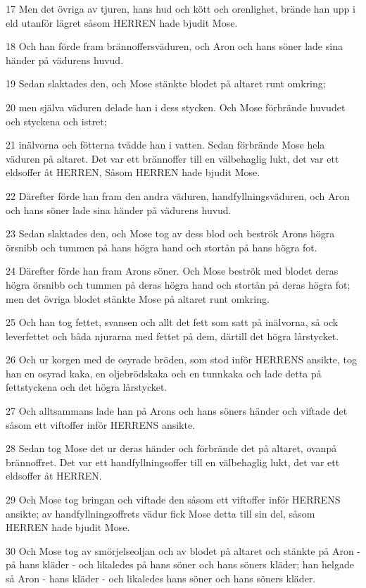 \par 17 Men det övriga av tjuren, hans hud och kött och orenlighet, brände han upp i eld utanför lägret såsom HERREN hade bjudit Mose.
\par 18 Och han förde fram brännoffersväduren, och Aron och hans söner lade sina händer på vädurens huvud.
\par 19 Sedan slaktades den, och Mose stänkte blodet på altaret runt omkring;
\par 20 men själva väduren delade han i dess stycken. Och Mose förbrände huvudet och styckena och istret;
\par 21 inälvorna och fötterna tvådde han i vatten. Sedan förbrände Mose hela väduren på altaret. Det var ett brännoffer till en välbehaglig lukt, det var ett eldsoffer åt HERREN, Såsom HERREN hade bjudit Mose.
\par 22 Därefter förde han fram den andra väduren, handfyllningsväduren, och Aron och hans söner lade sina händer på vädurens huvud.
\par 23 Sedan slaktades den, och Mose tog av dess blod och beströk Arons högra örsnibb och tummen på hans högra hand och stortån på hans högra fot.
\par 24 Därefter förde han fram Arons söner. Och Mose beströk med blodet deras högra örsnibb och tummen på deras högra hand och stortån på deras högra fot; men det övriga blodet stänkte Mose på altaret runt omkring.
\par 25 Och han tog fettet, svansen och allt det fett som satt på inälvorna, så ock leverfettet och båda njurarna med fettet på dem, därtill det högra lårstycket.
\par 26 Och ur korgen med de osyrade bröden, som stod inför HERRENS ansikte, tog han en osyrad kaka, en oljebrödskaka och en tunnkaka och lade detta på fettstyckena och det högra lårstycket.
\par 27 Och alltsammans lade han på Arons och hans söners händer och viftade det såsom ett viftoffer inför HERRENS ansikte.
\par 28 Sedan tog Mose det ur deras händer och förbrände det på altaret, ovanpå brännoffret. Det var ett handfyllningsoffer till en välbehaglig lukt, det var ett eldsoffer åt HERREN.
\par 29 Och Mose tog bringan och viftade den såsom ett viftoffer inför HERRENS ansikte; av handfyllningsoffrets vädur fick Mose detta till sin del, såsom HERREN hade bjudit Mose.
\par 30 Och Mose tog av smörjelseoljan och av blodet på altaret och stänkte på Aron - på hans kläder - och likaledes på hans söner och hans söners kläder; han helgade så Aron - hans kläder - och likaledes hans söner och hans söners kläder.
